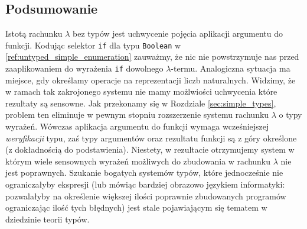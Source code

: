 \subsection{Podsumowanie}
Istotą rachunku \(\lambda\) bez typów jest uchwycenie pojęcia aplikacji argumentu do funkcji. Kodując selektor \texttt{if} dla typu \texttt{Boolean} w \ref{ref:untyped_simple_enumeration} zauważmy, że nic nie powstrzymuje nas przed zaaplikowaniem do wyrażenia \texttt{if} dowolnego \(\lambda\)-termu. Analogiczna sytuacja ma miejsce, gdy określamy operacje na reprezentacji liczb naturalnych. Widzimy, że w ramach tak zakrojonego systemu nie mamy możlwiości uchwycenia które rezultaty są sensowne. Jak przekonamy się w Rozdziale \ref{sec:simple_types}, problem ten eliminuje w pewnym stopniu rozszerzenie systemu rachunku \(\lambda\) o typy wyrażeń. Wówczas aplikacja argumentu do funkcji wymaga wcześniejszej \emph{weryfikacji} typu, zaś typy argumentów oraz rezultatu funkcji są z góry określone (z dokładnością do podstawienia). Niestety, w rezultacie otrzymujemy system w którym wiele sensownych wyrażeń możliwych do zbudowania w rachunku \(\lambda\) nie jest poprawnych. Szukanie bogatych systemów typów, które jednocześnie nie ograniczałyby ekspresji (lub mówiąc bardziej obrazowo językiem informatyki: pozwalałyby na określenie większej ilości poprawnie zbudowanych programów ograniczając ilość tych błędnych) jest stale pojawiającym się tematem w dziedzinie teorii typów.
